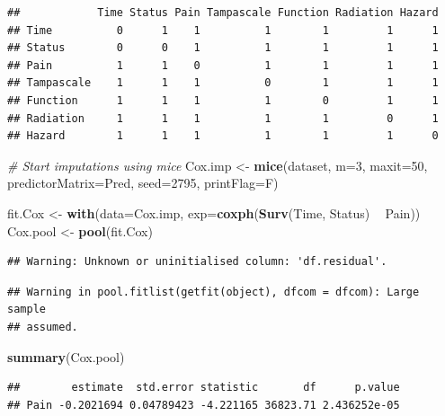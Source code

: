 \documentclass[]{book}
\newenvironment{Shaded}{\begin{snugshade}}{\end{snugshade}}
\newcommand{\KeywordTok}[1]{\textcolor[rgb]{0.13,0.29,0.53}{\textbf{#1}}}
\newcommand{\DataTypeTok}[1]{\textcolor[rgb]{0.13,0.29,0.53}{#1}}
\newcommand{\DecValTok}[1]{\textcolor[rgb]{0.00,0.00,0.81}{#1}}
\newcommand{\StringTok}[1]{\textcolor[rgb]{0.31,0.60,0.02}{#1}}
\newcommand{\CommentTok}[1]{\textcolor[rgb]{0.56,0.35,0.01}{\textit{#1}}}
\newcommand{\OperatorTok}[1]{\textcolor[rgb]{0.81,0.36,0.00}{\textbf{#1}}}
\newcommand{\NormalTok}[1]{#1}
\theoremstyle{definition}
\theoremstyle{definition}
\theoremstyle{definition}
\theoremstyle{remark}
\begin{document}
\begin{verbatim}
##            Time Status Pain Tampascale Function Radiation Hazard
## Time          0      1    1          1        1         1      1
## Status        0      0    1          1        1         1      1
## Pain          1      1    0          1        1         1      1
## Tampascale    1      1    1          0        1         1      1
## Function      1      1    1          1        0         1      1
## Radiation     1      1    1          1        1         0      1
## Hazard        1      1    1          1        1         1      0
\end{verbatim}

\begin{Shaded}
\begin{Highlighting}[]
\CommentTok{# Start imputations using mice}
\NormalTok{Cox.imp <-}\StringTok{ }\KeywordTok{mice}\NormalTok{(dataset, }\DataTypeTok{m=}\DecValTok{3}\NormalTok{, }\DataTypeTok{maxit=}\DecValTok{50}\NormalTok{, }\DataTypeTok{predictorMatrix=}\NormalTok{Pred, }\DataTypeTok{seed=}\DecValTok{2795}\NormalTok{, }\DataTypeTok{printFlag=}\NormalTok{F)}

\NormalTok{fit.Cox <-}\StringTok{ }\KeywordTok{with}\NormalTok{(}\DataTypeTok{data=}\NormalTok{Cox.imp, }\DataTypeTok{exp=}\KeywordTok{coxph}\NormalTok{(}\KeywordTok{Surv}\NormalTok{(Time, Status) }\OperatorTok{~}\StringTok{ }\NormalTok{Pain))}
\NormalTok{Cox.pool <-}\StringTok{ }\KeywordTok{pool}\NormalTok{(fit.Cox)}
\end{Highlighting}
\end{Shaded}

\begin{verbatim}
## Warning: Unknown or uninitialised column: 'df.residual'.
\end{verbatim}

\begin{verbatim}
## Warning in pool.fitlist(getfit(object), dfcom = dfcom): Large sample
## assumed.
\end{verbatim}

\begin{Shaded}
\begin{Highlighting}[]
\KeywordTok{summary}\NormalTok{(Cox.pool)}
\end{Highlighting}
\end{Shaded}

\begin{verbatim}
##        estimate  std.error statistic       df      p.value
## Pain -0.2021694 0.04789423 -4.221165 36823.71 2.436252e-05
\end{verbatim}
\end{document}
